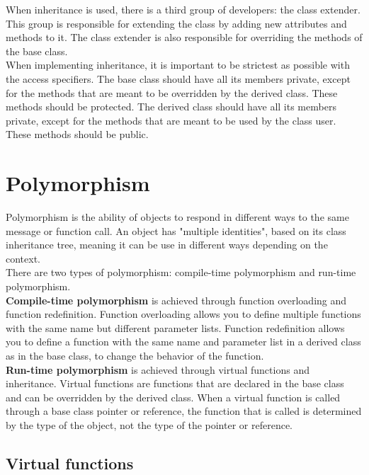 When inheritance is used, there is a third group of developers: the class extender. This
group is responsible for extending the class by adding new attributes and methods to it.
The class extender is also responsible for overriding the methods of the base class.\\

When implementing inheritance, it is important to be strictest as possible with the
access specifiers. The base class should have all its members private, except for the
methods that are meant to be overridden by the derived class. These methods should be
protected. The derived class should have all its members private, except for the methods
that are meant to be used by the class user. These methods should be public.

\section{Polymorphism}

Polymorphism is the ability of objects to respond in different ways to the same message or
function call. An object has "multiple identities", based on its class inheritance tree, meaning
it can be use in different ways depending on the context.\\

There are two types of polymorphism: compile-time polymorphism and run-time polymorphism.\\

\textbf{Compile-time polymorphism} is achieved through function overloading and function
redefinition. Function overloading allows you to define multiple functions with the same
name but different parameter lists. Function redefinition allows you to define a function
with the same name and parameter list in a derived class as in the base class, to change
the behavior of the function.\\

\textbf{Run-time polymorphism} is achieved through virtual functions and inheritance. Virtual
functions are functions that are declared in the base class and can be overridden by the
derived class. When a virtual function is called through a base class pointer or reference,
the function that is called is determined by the type of the object, not the type of the
pointer or reference.\\

\subsection{Virtual functions}

